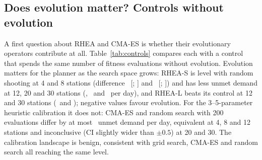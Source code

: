 \documentclass[conference,a4paper]{IEEEtran}
\begin{document}
\subsection{Does evolution matter? Controls without evolution}
A first question about RHEA and CMA-ES is whether their evolutionary operators contribute at all. Table~\ref{tab:controls} compares each with a control that spends the same number of
fitness evaluations without evolution. Evolution matters for the planner as the search space grows: RHEA-S is level with random shooting at 4 and 8 stations (difference
\cecCtlSDeltaA\ [\cecCtlSLoA; \cecCtlSHiA] and \cecCtlSDeltaB\ [\cecCtlSLoB; \cecCtlSHiB]) and has less unmet demand at 12, 20 and 30 stations (\cecCtlSDeltaC, \cecCtlSDeltaD\ and
\cecCtlSDeltaE\ per day), and RHEA-L beats its control at 12 and 30 stations (\cecCtlLDeltaC\ and \cecCtlLDeltaE); negative values favour evolution. For the 3--5-parameter heuristic calibration it does not: CMA-ES and random
search with 200 evaluations differ by at most \cecCtlCmaMax\ unmet demand per day, equivalent at 4, 8 and 12 stations and inconclusive (CI slightly wider than $\pm0.5$) at 20 and 30.
The calibration landscape is benign, consistent with grid search, CMA-ES and random search all reaching the same level.

\begin{table}[t]
\centering\scriptsize\setlength{\tabcolsep}{2.5pt}
\caption{Controls without evolution, unmet demand per day. RHEA $-$ random shooting (RS, RL: same number of sequence evaluations as S, L; paired over the \cecN\ scenarios, 95\% bootstrap CI;
negative: RHEA better) and CMA-ES $-$ random search (200 evaluations, 10 runs; Welch 95\% CI; ``equivalent'': CI within $\pm0.5$).}
\label{tab:controls}

\end{table}
\end{document}

